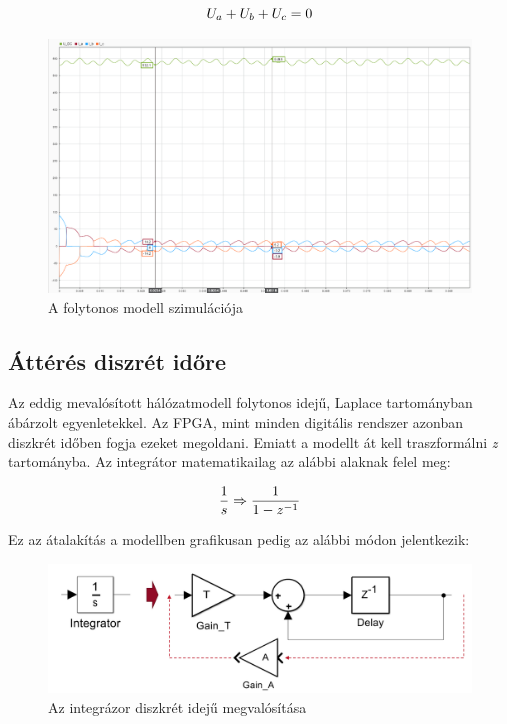 \begin{equation}
    \centering
    U_a+U_b+U_c = 0
\end{equation}

\begin{figure}[H!]
	\centering
	\includegraphics[width = \textwidth]{figures/continous_testrun_1.png}
	\caption{A folytonos modell szimulációja} 
	\label{fig:cont_run}
\end{figure}


\subsection{Áttérés diszrét időre}

Az eddig mevalósított hálózatmodell folytonos idejű, Laplace tartományban ábárzolt egyenletekkel. Az FPGA, mint minden digitális rendszer azonban diszkrét időben fogja ezeket megoldani. Emiatt a modellt át kell traszformálni \emph{z} tartományba. Az integrátor matematikailag az alábbi alaknak felel meg:

\begin{equation}
\centering
\frac{1}{s} \Rightarrow \frac{1}{1-z^{-1}}
\end{equation}

Ez az átalakítás a modellben grafikusan pedig az alábbi módon jelentkezik:

\begin{figure}[H!]
	\centering
	\includegraphics[width = \textwidth]{figures/integrator.png}
	\caption{Az integrázor diszkrét idejű megvalósítása} 
	\label{fig:integrator}
\end{figure}

